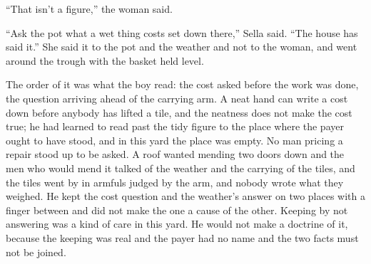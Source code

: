 “That isn't a figure,” the woman said.

“Ask the pot what a wet thing costs set down there,” Sella said. “The house has said it.” She said it to the pot and the weather and not to the woman, and went around the trough with the basket held level.

The order of it was what the boy read: the cost asked before the work was done, the question arriving ahead of the carrying arm. A neat hand can write a cost down before anybody has lifted a tile, and the neatness does not make the cost true; he had learned to read past the tidy figure to the place where the payer ought to have stood, and in this yard the place was empty. No man pricing a repair stood up to be asked. A roof wanted mending two doors down and the men who would mend it talked of the weather and the carrying of the tiles, and the tiles went by in armfuls judged by the arm, and nobody wrote what they weighed. He kept the cost question and the weather's answer on two places with a finger between and did not make the one a cause of the other. Keeping by not answering was a kind of care in this yard. He would not make a doctrine of it, because the keeping was real and the payer had no name and the two facts must not be joined.


